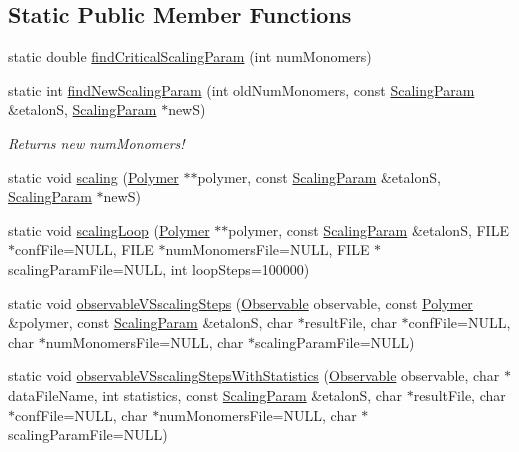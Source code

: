 \subsection*{Static Public Member Functions}
\begin{DoxyCompactItemize}
\item 
static double \hyperlink{class_p_c_a_1_1_polymer_scaling_a6188be73e2162d21f113a6cf8cde477b}{find\+Critical\+Scaling\+Param} (int num\+Monomers)
\item 
static int \hyperlink{class_p_c_a_1_1_polymer_scaling_ac58e92df3f25d46f03fe2231dcc1cf33}{find\+New\+Scaling\+Param} (int old\+Num\+Monomers, const \hyperlink{class_p_c_a_1_1_polymer_scaling_1_1_scaling_param}{Scaling\+Param} \&etalonS, \hyperlink{class_p_c_a_1_1_polymer_scaling_1_1_scaling_param}{Scaling\+Param} $\ast$newS)
\begin{DoxyCompactList}\small\item\em Returns new num\+Monomers! \end{DoxyCompactList}\item 
static void \hyperlink{class_p_c_a_1_1_polymer_scaling_a209214a658e1da7ccc0e520742cd1e3d}{scaling} (\hyperlink{class_p_c_a_1_1_polymer}{Polymer} $\ast$$\ast$polymer, const \hyperlink{class_p_c_a_1_1_polymer_scaling_1_1_scaling_param}{Scaling\+Param} \&etalonS, \hyperlink{class_p_c_a_1_1_polymer_scaling_1_1_scaling_param}{Scaling\+Param} $\ast$newS)
\item 
static void \hyperlink{class_p_c_a_1_1_polymer_scaling_a5286d41c8e899e596526fb936a5e2a9b}{scaling\+Loop} (\hyperlink{class_p_c_a_1_1_polymer}{Polymer} $\ast$$\ast$polymer, const \hyperlink{class_p_c_a_1_1_polymer_scaling_1_1_scaling_param}{Scaling\+Param} \&etalonS, F\+I\+LE $\ast$conf\+File=N\+U\+LL, F\+I\+LE $\ast$num\+Monomers\+File=N\+U\+LL, F\+I\+LE $\ast$scaling\+Param\+File=N\+U\+LL, int loop\+Steps=100000)
\item 
static void \hyperlink{class_p_c_a_1_1_polymer_scaling_a18511591a08a3c6bc6e5fbc48b488a41}{observable\+V\+Sscaling\+Steps} (\hyperlink{class_p_c_a_1_1_polymer_scaling_aa4112660455a10f29c208c96655718c0}{Observable} observable, const \hyperlink{class_p_c_a_1_1_polymer}{Polymer} \&polymer, const \hyperlink{class_p_c_a_1_1_polymer_scaling_1_1_scaling_param}{Scaling\+Param} \&etalonS, char $\ast$result\+File, char $\ast$conf\+File=N\+U\+LL, char $\ast$num\+Monomers\+File=N\+U\+LL, char $\ast$scaling\+Param\+File=N\+U\+LL)
\item 
static void \hyperlink{class_p_c_a_1_1_polymer_scaling_aca7d618f0d4ffe3edb9c72ce28839e4f}{observable\+V\+Sscaling\+Steps\+With\+Statistics} (\hyperlink{class_p_c_a_1_1_polymer_scaling_aa4112660455a10f29c208c96655718c0}{Observable} observable, char $\ast$data\+File\+Name, int statistics, const \hyperlink{class_p_c_a_1_1_polymer_scaling_1_1_scaling_param}{Scaling\+Param} \&etalonS, char $\ast$result\+File, char $\ast$conf\+File=N\+U\+LL, char $\ast$num\+Monomers\+File=N\+U\+LL, char $\ast$scaling\+Param\+File=N\+U\+LL)
\end{DoxyCompactItemize}
